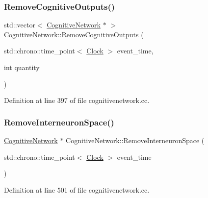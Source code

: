 \mbox{\label{class_cognitive_network_a2f4956b004c828f0165f28c03e089144}} 
\subsubsection{\texorpdfstring{Remove\+Cognitive\+Outputs()}{RemoveCognitiveOutputs()}}
{\footnotesize\ttfamily std\+::vector$<$ \mbox{\hyperlink{class_cognitive_network}{Cognitive\+Network}} $\ast$ $>$ Cognitive\+Network\+::\+Remove\+Cognitive\+Outputs (\begin{DoxyParamCaption}\item[{std\+::chrono\+::time\+\_\+point$<$ \mbox{\hyperlink{universe_8h_a0ef8d951d1ca5ab3cfaf7ab4c7a6fd80}{Clock}} $>$}]{event\+\_\+time,  }\item[{int}]{quantity }\end{DoxyParamCaption})}



Definition at line 397 of file cognitivenetwork.\+cc.

\mbox{\label{class_cognitive_network_a04e38cea356f1c7ac31c4df5e19d759c}} 
\subsubsection{\texorpdfstring{Remove\+Interneuron\+Space()}{RemoveInterneuronSpace()}}
{\footnotesize\ttfamily \mbox{\hyperlink{class_cognitive_network}{Cognitive\+Network}} $\ast$ Cognitive\+Network\+::\+Remove\+Interneuron\+Space (\begin{DoxyParamCaption}\item[{std\+::chrono\+::time\+\_\+point$<$ \mbox{\hyperlink{universe_8h_a0ef8d951d1ca5ab3cfaf7ab4c7a6fd80}{Clock}} $>$}]{event\+\_\+time }\end{DoxyParamCaption})}



Definition at line 501 of file cognitivenetwork.\+cc.

\mbox{\label{class_cognitive_network_a994c5f93447a82429809c89aa08d3dc1}} 
